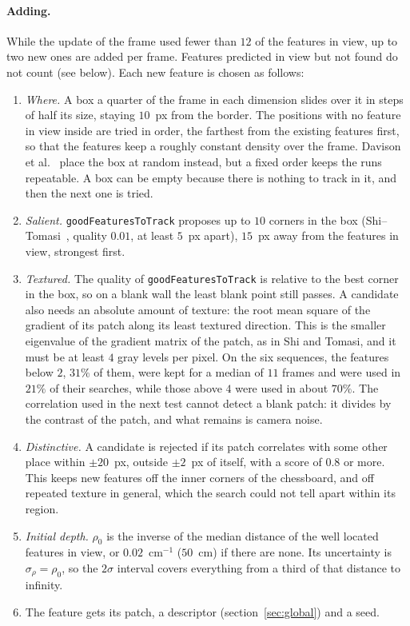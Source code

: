 \documentclass[11pt]{article}
\begin{document}
\paragraph{Adding.}
While the update of the frame used fewer than $12$ of the features in view, up to two new ones are
added per frame. Features predicted in view but not found do not count (see below). Each new
feature is chosen as follows:
\begin{enumerate}
  \item \emph{Where.} A box a quarter of the frame in each dimension slides over it in steps of half
        its size, staying $10$~px from the border. The positions with no feature in view inside are
        tried in order, the farthest from the existing features first, so that the features keep a
        roughly constant density over the frame. Davison et al.~\cite{davison2007} place the box at
        random instead, but a fixed order keeps the runs repeatable. A box can be empty because
        there is nothing to track in it, and then the next one is tried.
  \item \emph{Salient.} \texttt{goodFeaturesToTrack} proposes up to $10$ corners in the box
        (Shi--Tomasi~\cite{shi1994}, quality $0.01$, at least $5$~px apart), $15$~px away from the
        features in view, strongest first.
  \item \emph{Textured.} The quality of \texttt{goodFeaturesToTrack} is relative to the best corner
        in the box, so on a blank wall the least blank point still passes. A candidate also needs
        an absolute amount of texture: the root mean square of the gradient of its patch along its
        least textured direction. This is the smaller eigenvalue of the gradient matrix of the
        patch, as in Shi and Tomasi, and it must be at least $4$ gray levels per pixel. On the six
        sequences, the features below $2$, $31\%$ of them, were kept for a median of $11$ frames and
        were used in $21\%$ of their searches, while those above $4$ were used in about $70\%$. The
        correlation used in the next test cannot detect a blank patch: it divides by the contrast
        of the patch, and what remains is camera noise.
  \item \emph{Distinctive.} A candidate is rejected if its patch correlates with some other place
        within $\pm 20$~px, outside $\pm 2$~px of itself, with a score of $0.8$ or more. This keeps
        new features off the inner corners of the chessboard, and off repeated texture in general,
        which the search could not tell apart within its region.
  \item \emph{Initial depth.} $\rho_0$ is the inverse of the median distance of the well located
        features in view, or $0.02$~cm$^{-1}$ ($50$~cm) if there are none. Its uncertainty is
        $\sigma_\rho = \rho_0$, so the $2\sigma$ interval covers everything from a third of that
        distance to infinity.
      \item The feature gets its patch, a descriptor (section~\ref{sec:global}) and a seed.
\end{enumerate}
\end{document}
